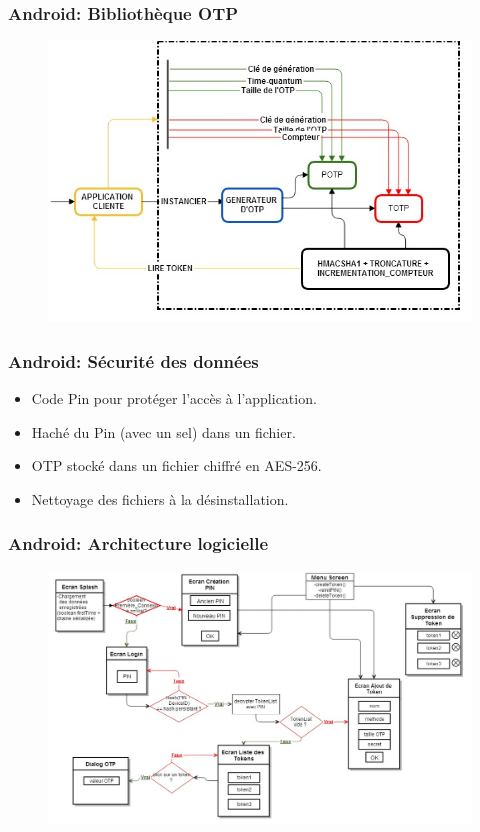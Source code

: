\documentclass[xcolor=table]{beamer}
\begin{document}
\begin{frame}
\frametitle{Android: Bibliothèque OTP}
\begin{figure}
 \includegraphics[scale=0.40]{../graphics/libotp-android.jpg} 
\end{figure}
\end{frame}

\begin{frame}
\frametitle{Android: Sécurité des données}
\begin{itemize}
\item Code Pin pour protéger l'accès à l'application.
\item Haché du Pin (avec un sel) dans un fichier.
\item OTP stocké dans un fichier chiffré en AES-256.
\item Nettoyage des fichiers à la désinstallation.
\end{itemize}
\end{frame}





\begin{frame}
\frametitle{Android: Architecture logicielle}
\begin{figure}
 \includegraphics[scale=0.3]{../graphics/archi-android.jpg} 
\end{figure}

\end{frame}
\end{document}
